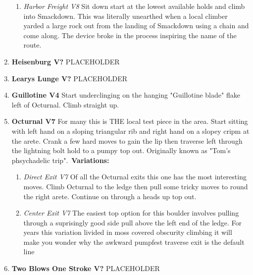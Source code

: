 \begin{enumerate}[]
\begin{enumerate}
		\item\label{vr:Harbor Freight} \colorbox{Goldenrod!50}{\emph{Harbor Freight V8  }  }
		\newline Sit down start at the lowest available holds and climb into Smackdown. This was literally unearthed when a local climber yarded a large rock out from the landing of Smackdown using a chain and come along. The device broke in the process inspiring the name of the route.\
	\end{enumerate}
	\item\label{rt:Heisenburg} \colorbox{black!20}{\textbf{Heisenburg V?  } }
	\newline PLACEHOLDER\
	\item\label{rt:Learys Lunge} \colorbox{black!20}{\textbf{Learys Lunge V?  } }
	\newline PLACEHOLDER\
	\item\label{rt:Guillotine} \colorbox{RoyalBlue!20}{\textbf{Guillotine V4     } }
	\newline Start underclinging on the hanging "Guillotine blade" flake left of Octurnal. Climb straight up.\
	\item\label{rt:Octurnal} \colorbox{Goldenrod!50}{\textbf{Octurnal V7       } }
	\newline For many this is THE local test piece in the area. Start sitting with left hand on a sloping triangular rib and right hand on a slopey cripm at the arete. Crank a few hard moves to gain the lip then traverse left through the lightning bolt hold to a pumpy top out. Originally known as "Tom's phsychadelic trip".\
	\newline \textbf{Variations:}
	\begin{enumerate}
		\item\label{vr:Direct Exit} \colorbox{Goldenrod!50}{\emph{Direct Exit V7       }  }
		\newline Of all the Octurnal exits this one has the most interesting moves. Climb Octurnal to the ledge then pull some tricky moves to round the right arete. Continue on through a heads up top out.\
		\item\label{vr:Center Exit} \colorbox{Goldenrod!50}{\emph{Center Exit V7   \ding{72} \ding{72}  }  }
		\newline The easiest top option for this boulder involves pulling through a suprisingly good side pull above the left end of the ledge. For years this variation livided in moss covered obscurity climbing it will make you wonder why the awkward pumpfest traverse exit is the default line\
	\end{enumerate}
	\item\label{rt:Two Blows One Stroke} \colorbox{black!20}{\textbf{Two Blows One Stroke V?  } }
	\newline PLACEHOLDER\
\end{enumerate}
